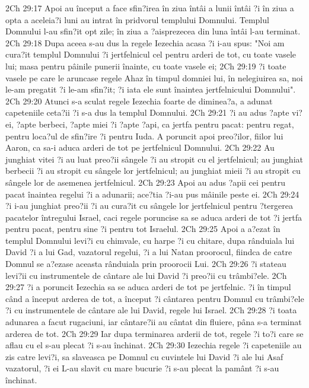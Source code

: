 2Ch 29:17  Apoi au început a face sfin?irea în ziua întâi a lunii întâi ?i în ziua a opta a aceleia?i luni au intrat în pridvorul templului Domnului. Templul Domnului l-au sfin?it opt zile; în ziua a ?aisprezecea din luna întâi l-au terminat.
2Ch 29:18  Dupa aceea s-au dus la regele Iezechia acasa ?i i-au spus: "Noi am cura?it templul Domnului ?i jertfelnicul cel pentru arderi de tot, cu toate vasele lui; masa pentru pâinile punerii înainte, cu toate vasele ei;
2Ch 29:19  ?i toate vasele pe care le aruncase regele Ahaz în timpul domniei lui, în nelegiuirea sa, noi le-am pregatit ?i le-am sfin?it; ?i iata ele sunt înaintea jertfelnicului Domnului".
2Ch 29:20  Atunci s-a sculat regele Iezechia foarte de diminea?a, a adunat capeteniile ceta?ii ?i s-a dus la templul Domnului.
2Ch 29:21  ?i au adus ?apte vi?ei, ?apte berbeci, ?apte miei ?i ?apte ?api, ca jertfa pentru pacat: pentru regat, pentru loca?ul de sfin?ire ?i pentru Iuda. A poruncit apoi preo?ilor, fiilor lui Aaron, ca sa-i aduca arderi de tot pe jertfelnicul Domnului.
2Ch 29:22  Au junghiat vitei ?i au luat preo?ii sângele ?i au stropit cu el jertfelnicul; au junghiat berbecii ?i au stropit cu sângele lor jertfelnicul; au junghiat mieii ?i au stropit cu sângele lor de asemenea jertfelnicul.
2Ch 29:23  Apoi au adus ?apii cei pentru pacat înaintea regelui ?i a adunarii; ace?tia ?i-au pus mâinile peste ei.
2Ch 29:24  ?i i-au junghiat preo?ii ?i au cura?it cu sângele lor jertfelnicul pentru ?tergerea pacatelor întregului Israel, caci regele poruncise sa se aduca arderi de tot ?i jertfa pentru pacat, pentru sine ?i pentru tot Israelul.
2Ch 29:25  Apoi a a?ezat în templul Domnului levi?i cu chimvale, cu harpe ?i cu chitare, dupa rânduiala lui David ?i a lui Gad, vazatorul regelui, ?i a lui Natan proorocul, fiindca de catre Domnul se a?ezase aceasta rânduiala prin proorocii Lui.
2Ch 29:26  ?i stateau levi?ii cu instrumentele de cântare ale lui David ?i preo?ii cu trâmbi?ele.
2Ch 29:27  ?i a poruncit Iezechia sa se aduca arderi de tot pe jertfelnic. ?i în timpul când a început arderea de tot, a început ?i cântarea pentru Domnul cu trâmbi?ele ?i cu instrumentele de cântare ale lui David, regele lui Israel.
2Ch 29:28  ?i toata adunarea a facut rugaciuni, iar cântare?ii au cântat din fluiere, pâna s-a terminat arderea de tot.
2Ch 29:29  Iar dupa terminarea arderii de tot, regele ?i to?i care se aflau cu el s-au plecat ?i s-au închinat.
2Ch 29:30  Iezechia regele ?i capeteniile au zis catre levi?i, sa slaveasca pe Domnul cu cuvintele lui David ?i ale lui Asaf vazatorul, ?i ei L-au slavit cu mare bucurie ?i s-au plecat la pamânt ?i s-au închinat.
